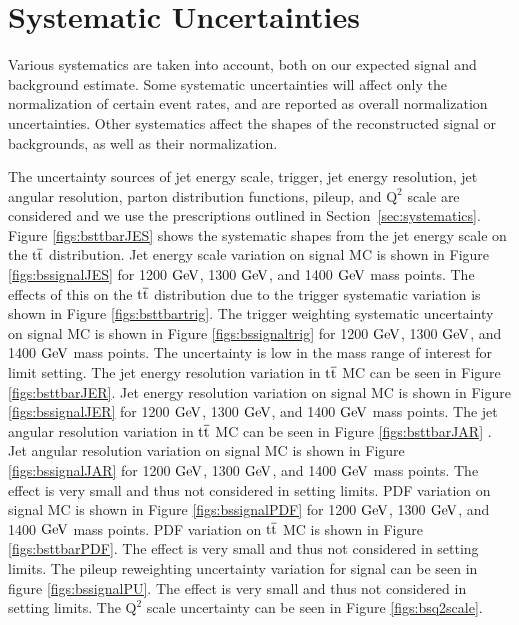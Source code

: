 \clearpage
\newpage
\section{Systematic Uncertainties}
\label{sec:bssystematics}
Various systematics are taken into account, both 
on our expected signal and background estimate. Some systematic uncertainties will affect only the normalization of certain event rates, 
and are reported as overall normalization uncertainties. Other systematics affect the shapes of the reconstructed signal or backgrounds, as well as their normalization.  

The uncertainty sources of jet energy scale, trigger, jet energy resolution, jet angular resolution,  parton distribution functions, pileup, and $\mathrm{Q^2}$ scale are considered 
and we use the prescriptions outlined in Section~\ref{sec:systematics}.  Figure \ref{figs:bsttbarJES} shows the systematic shapes from the 
jet energy scale on the $\mathrm{t\overline{t}}$ distribution.  Jet energy scale variation on signal MC is shown in Figure \ref{figs:bssignalJES} for 1200$~\mathrm{GeV}$,
 1300$~\mathrm{GeV}$, and 1400$~\mathrm{GeV}$ mass points.  The effects of this on the $\mathrm{t\overline{t}}$ 
distribution due to the trigger systematic variation is shown in Figure \ref{figs:bsttbartrig}. The trigger weighting systematic uncertainty on signal MC is 
shown in Figure \ref{figs:bssignaltrig} for 1200$~\mathrm{GeV}$,
 1300$~\mathrm{GeV}$, and 1400$~\mathrm{GeV}$ mass points.  The uncertainty is low in the mass range of interest for limit setting.  
The jet energy resolution variation in $\mathrm{t\overline{t}}$ MC can be seen in Figure \ref{figs:bsttbarJER}.  Jet energy resolution variation on signal MC 
is shown in Figure \ref{figs:bssignalJER} for 1200$~\mathrm{GeV}$, 1300$~\mathrm{GeV}$, and 1400$~\mathrm{GeV}$ mass points.  
The jet angular resolution variation in $\mathrm{t\overline{t}}$ MC can be seen in Figure \ref{figs:bsttbarJAR} . Jet angular resolution 
variation on signal MC is shown in Figure \ref{figs:bssignalJAR} for 1200$~\mathrm{GeV}$, 1300$~\mathrm{GeV}$, and 1400$~\mathrm{GeV}$ mass points.  
The effect is very small and thus not considered in setting limits.  PDF variation on signal MC is shown in Figure \ref{figs:bssignalPDF} for 1200$~\mathrm{GeV}$,
 1300$~\mathrm{GeV}$, and 1400$~\mathrm{GeV}$ mass points.  PDF variation on $\mathrm{t\overline{t}}$ MC is shown in Figure \ref{figs:bsttbarPDF}.  
The effect is very small and thus not considered in setting limits.  The pileup reweighting uncertainty variation for signal  
can be seen in figure \ref{figs:bssignalPU}.  The effect is very small and thus not considered in setting limits.  
The $\mathrm{Q^2}$ scale uncertainty can be seen in Figure \ref{figs:bsq2scale}.


